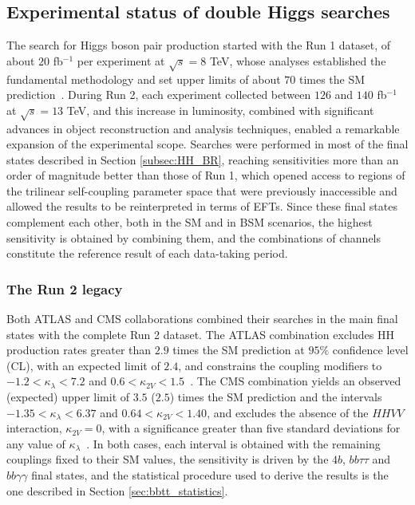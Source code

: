 \subsection{Experimental status of double Higgs searches}
\label{subsec:Searches}
%
The search for Higgs boson pair production started with the Run 1 dataset, of about $20$ fb$^{-1}$ per experiment at $\sqrt{s}=8$ TeV, whose analyses established the fundamental methodology and set upper limits of about $70$ times the SM prediction~\cite{ATLAS:2015sxd,CMS-HIG-15-013}. During Run 2, each experiment collected between $126$ and $140$ fb$^{-1}$ at $\sqrt{s}=13$ TeV, and this increase in luminosity, combined with significant advances in object reconstruction and analysis techniques, enabled a remarkable expansion of the experimental scope. Searches were performed in most of the final states described in Section \ref{subsec:HH_BR}, reaching sensitivities more than an order of magnitude better than those of Run 1, which opened access to regions of the trilinear self-coupling parameter space that were previously inaccessible and allowed the results to be reinterpreted in terms of EFTs. Since these final states complement each other, both in the SM and in BSM scenarios, the highest sensitivity is obtained by combining them, and the combinations of channels constitute the reference result of each data-taking period.


\subsubsection{The Run 2 legacy}
%
Both ATLAS and CMS collaborations combined their searches in the main final states with the complete Run 2 dataset. The ATLAS combination excludes HH production rates greater than $2.9$ times the SM prediction at $95\%$ confidence level (CL), with an expected limit of $2.4$, and constrains the coupling modifiers to $-1.2 < \kappa_\lambda < 7.2$ and $0.6 < \kappa_{2V} < 1.5$~\cite{ATLAS:2024ish}. The CMS combination yields an observed (expected) upper limit of $3.5$ ($2.5$) times the SM prediction and the intervals $-1.35 < \kappa_\lambda < 6.37$ and $0.64 < \kappa_{2V} < 1.40$, and excludes the absence of the $HHVV$ interaction, $\kappa_{2V}=0$, with a significance greater than five standard deviations for any value of $\kappa_\lambda$~\cite{CMS_combination}. In both cases, each interval is obtained with the remaining couplings fixed to their SM values, the sensitivity is driven by the $4b$, $bb\tau\tau$ and $bb\gamma\gamma$ final states, and the statistical procedure used to derive the results is the one described in Section \ref{sec:bbtt_statistics}.


